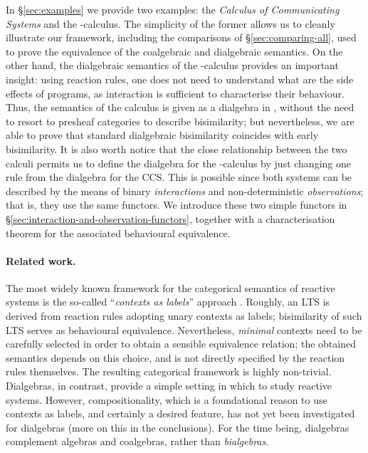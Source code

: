 \documentclass[orivec]{llncs}
\begin{document}
In \S \ref{sec:examples} we provide two examples: the \emph{Calculus of Communicating Systems} and the -calculus. The simplicity of the former allows us to cleanly illustrate our framework, including the comparisons of \S\ref{sec:comparing-all}, used to prove the equivalence of the coalgebraic and dialgebraic semantics. On the other hand, the dialgebraic semantics of the -calculus provides an important insight: using reaction rules, one does not need to understand what are the side effects of programs, as interaction is sufficient to characterise their behaviour. Thus, the semantics of the calculus is given as a dialgebra in , without the need to resort to presheaf categories to describe bisimilarity; but nevertheless, we are able to prove that standard dialgebraic bisimilarity coincides with early bisimilarity. It is also worth notice that the close relationship between the two calculi permits us to define the dialgebra for the -calculus by just changing one rule from the dialgebra for the CCS.  This is possible since both systems can be described by the means of binary \emph{interactions} and non-deterministic \emph{observations}; that is, they use the same functors. We introduce these two simple functors in \S \ref{sec:interaction-and-observation-functors}, together with a characterisation theorem for the associated behavioural equivalence.



\paragraph{Related work.} The most widely known framework for the categorical semantics of reactive systems is the so-called ``\emph{contexts as labels}'' approach \cite{lm00,Sew02,ss03}. Roughly, an LTS is derived from reaction rules adopting unary contexts as labels; bisimilarity of such LTS serves as behavioural equivalence.
Nevertheless, \emph{minimal} contexts need to be carefully selected in order to obtain a sensible equivalence relation; the obtained semantics depends on this choice, and is not directly specified by the reaction rules themselves. The resulting categorical framework is highly non-trivial.
Dialgebras, in contrast, provide a simple setting in which to study reactive systems. However, compositionality, which is a foundational reason to use contexts as labels, and certainly a desired feature, has not yet been investigated for dialgebras (more on this in the conclusions). For the time being, dialgebras complement algebras and coalgebras, rather than \emph{bialgebras}. 
\end{document}
